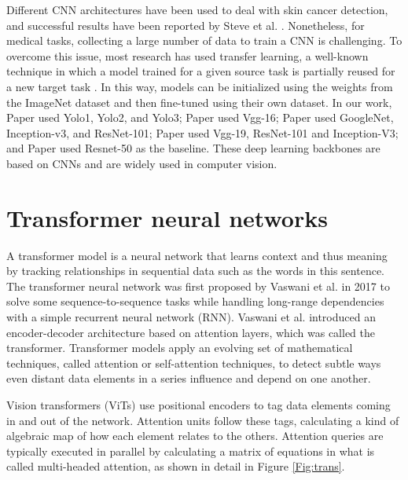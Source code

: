 Different CNN architectures have been used to deal with skin cancer detection, and successful results have been reported by Steve et al. \cite{esteva2017dermatologist}. Nonetheless, for medical tasks, collecting a large number of data to train a CNN is challenging. To overcome this issue, most research has used transfer learning, a well-known technique in which a model trained for a given source task is partially reused for a new target task \cite{menegola2017knowledge}. In this way, models can be initialized using the weights from the ImageNet dataset \cite{russakovsky2015imagenet} and then fine-tuned using their own dataset. In our work, Paper \uppercase\expandafter{} used Yolo1, Yolo2, and Yolo3; Paper \uppercase\expandafter{} used Vgg-16; Paper \uppercase\expandafter{} used GoogleNet, Inception-v3, and ResNet-101; Paper \uppercase\expandafter{} used Vgg-19, ResNet-101 and Inception-V3; and Paper \uppercase\expandafter{} used Resnet-50 as the baseline. These deep learning backbones are based on CNNs and are widely used in computer vision.

\section{Transformer neural networks}  \label{sec:trans}

A transformer model is a neural network that learns context and thus meaning by tracking relationships in sequential data such as the words in this sentence. The transformer neural network was first proposed by Vaswani et al. \cite{vaswani2017attention} in 2017 to solve some sequence-to-sequence tasks while handling long-range dependencies with a simple recurrent neural network (RNN). Vaswani et al. introduced an encoder-decoder architecture based on attention layers, which was called the transformer. Transformer models apply an evolving set of mathematical techniques, called attention or self-attention techniques, to detect subtle ways even distant data elements in a series influence and depend on one another.

Vision transformers (ViTs) use positional encoders to tag data elements coming in and out of the network. Attention units follow these tags, calculating a kind of algebraic map of how each element relates to the others. Attention queries are typically executed in parallel by calculating a matrix of equations in what is called multi-headed attention, as shown in detail in Figure \ref{Fig:trans}.

